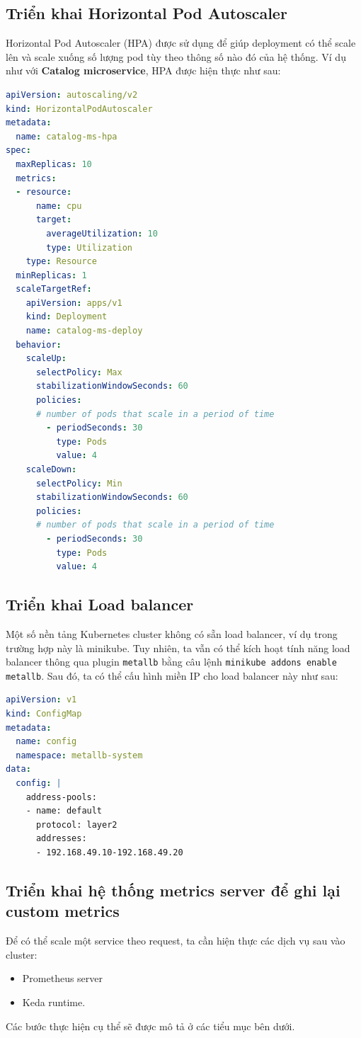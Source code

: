 \subsection{Triển khai Horizontal Pod Autoscaler}
\noindent Horizontal Pod Autoscaler (HPA) được sử dụng để giúp deployment có thể scale lên và scale xuống số lượng pod tùy theo thông số nào đó của hệ thống. Ví dụ như với \textbf{Catalog microservice}, HPA được hiện thực như sau:
\begin{lstlisting}[language=yaml]
apiVersion: autoscaling/v2
kind: HorizontalPodAutoscaler
metadata:
  name: catalog-ms-hpa
spec:
  maxReplicas: 10
  metrics:
  - resource:
      name: cpu
      target:
        averageUtilization: 10
        type: Utilization
    type: Resource
  minReplicas: 1
  scaleTargetRef:
    apiVersion: apps/v1
    kind: Deployment
    name: catalog-ms-deploy
  behavior:
    scaleUp:
      selectPolicy: Max
      stabilizationWindowSeconds: 60
      policies:
      # number of pods that scale in a period of time
        - periodSeconds: 30
          type: Pods
          value: 4
    scaleDown:
      selectPolicy: Min
      stabilizationWindowSeconds: 60
      policies:
      # number of pods that scale in a period of time
        - periodSeconds: 30
          type: Pods
          value: 4
\end{lstlisting}
\subsection{Triển khai Load balancer}
\noindent Một số nền tảng Kubernetes cluster không có sẵn load balancer, ví dụ trong trường hợp này là minikube. Tuy nhiên, ta vẫn có thể kích hoạt tính năng load balancer thông qua plugin \lstinline|metallb| bằng câu lệnh \lstinline|minikube addons enable metallb|. Sau đó, ta có thể cấu hình miền IP cho load balancer này như sau:
\begin{lstlisting}[language=yaml]
apiVersion: v1
kind: ConfigMap
metadata:
  name: config
  namespace: metallb-system
data:
  config: |
    address-pools:
    - name: default
      protocol: layer2
      addresses:
      - 192.168.49.10-192.168.49.20
\end{lstlisting}

\subsection{Triển khai hệ thống metrics server để ghi lại custom metrics}
\noindent Để có thể scale một service theo request, ta cần hiện thực các dịch vụ sau vào cluster:
\begin{itemize}
  \item Prometheus server
  \item Keda runtime.
\end{itemize}
Các bước thực hiện cụ thể sẽ được mô tả ở các tiểu mục bên dưới.
